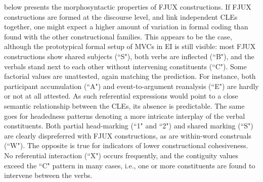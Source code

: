 
 below presents the morphosyntactic properties of FJUX constructions. If FJUX constructions are formed at the discourse level, and link independent CLEs together, one might expect a higher amount of variation in formal coding than found with the other constructional families. This appears to be the case, although the prototypical formal setup of MVCs in EI is still visible: most FJUX constructions show shared subjects (``S"), both verbs are inflected (``B"), and the verbals stand next to each other without intervening constituents (``C"). Some factorial values are unattested, again matching the prediction. For instance, both participant accumulation (``A") and event-to-argument reanalysis (``E") are hardly or not at all attested. As such referential expressions would point to a close semantic relationship between the CLEs, its absence is predictable. The same goes for headedness patterns denoting a more intricate interplay of the verbal constituents. Both partial head-marking (``1" and ``2") and shared marking (``S") are clearly dispreferred with FJUX constructions, as are within-word construals (``W"). The opposite is true for indicators of lower constructional cohesiveness. No referential interaction (``X") occurs frequently, and the contiguity values exceed the ``C" pattern in many cases, i.e., one or more constituents are found to intervene between the verbs.

